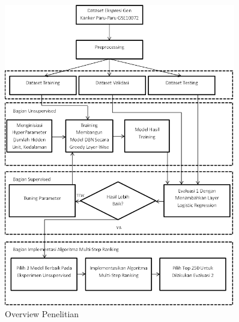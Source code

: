 \begin{figure}
	\centering
	\includegraphics[width=0.9\textwidth]
		{pics/overview.png}
	\caption{Overview Penelitian}
	\label{fig:overview}
\end{figure}

